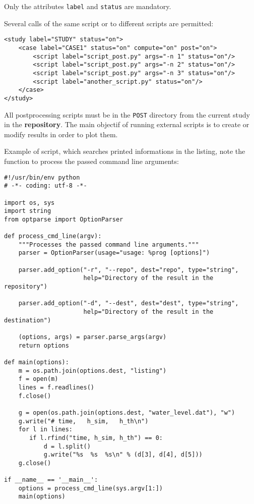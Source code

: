 \documentclass[a4paper,10pt,twoside]{csshortdoc}
\begin{document}
Only the attributes \texttt{label} and \texttt{status} are mandatory.

Several calls of the same script or to different scripts are permitted:
\small
\begin{verbatim}
<study label="STUDY" status="on">
    <case label="CASE1" status="on" compute="on" post="on">
        <script label="script_post.py" args="-n 1" status="on"/>
        <script label="script_post.py" args="-n 2" status="on"/>
        <script label="script_post.py" args="-n 3" status="on"/>
        <script label="another_script.py" status="on"/>
    </case>
</study>
\end{verbatim}
\normalsize

All postprocessing scripts must be in the \texttt{POST} directory from
the current study in the \textbf{repository}.
The main objectif of running external scripts is to create or modify
results in order to plot them.

Example of script, which searches printed informations in the listing,
note the function to process the passed command line arguments:
\small
\begin{verbatim}
#!/usr/bin/env python
# -*- coding: utf-8 -*-

import os, sys
import string
from optparse import OptionParser

def process_cmd_line(argv):
    """Processes the passed command line arguments."""
    parser = OptionParser(usage="usage: %prog [options]")

    parser.add_option("-r", "--repo", dest="repo", type="string",
                      help="Directory of the result in the repository")

    parser.add_option("-d", "--dest", dest="dest", type="string",
                      help="Directory of the result in the destination")

    (options, args) = parser.parse_args(argv)
    return options

def main(options):
    m = os.path.join(options.dest, "listing")
    f = open(m)
    lines = f.readlines()
    f.close()

    g = open(os.path.join(options.dest, "water_level.dat"), "w")
    g.write("# time,   h_sim,   h_th\n")
    for l in lines:
       if l.rfind("time, h_sim, h_th") == 0:
           d = l.split()
           g.write("%s  %s  %s\n" % (d[3], d[4], d[5]))
    g.close()

if __name__ == '__main__':
    options = process_cmd_line(sys.argv[1:])
    main(options)
\end{verbatim}
\normalsize
\end{document}
